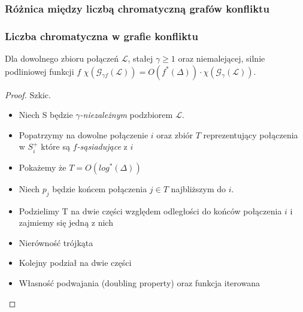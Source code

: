 \documentclass[polish, t,10pt]{beamer}
\begin{document}
\subsubsection{Różnica między liczbą chromatyczną grafów konfliktu}
    \begin{frame}
        \frametitle{Liczba chromatyczna w grafie konfliktu}
        \begin{theorem}
            Dla dowolnego zbioru połączeń $\mathcal{L}$, stałej $\gamma \ge 1$ oraz niemalejącej, silnie podliniowej funkcji $f$
            $\chi(\mathcal{G}_{\gamma f}(\mathcal{L})) = O(f^{*}(\Delta)) \cdot \chi(\mathcal{G}_{\gamma}(\mathcal{L}))$.
        \end{theorem}
        \begin{proof}
            Szkic.
            \begin{itemize}
                \item Niech S będzie \textit{$\gamma$-niezależnym} podzbiorem $\mathcal{L}$.
                \item Popatrzymy na dowolne połączenie $i$ oraz zbiór $T$ reprezentujący połączenia w $S^{+}_i$ które są \textit{$f$-sąsiadujące} z $i$
                \item Pokażemy że $T = O(log^{*}(\Delta))$
                \item Niech $p_j$ będzie końcem połączenia $j \in T$ najbliższym do $i$.
                \item Podzielimy T na dwie części względem odległości do końców połączenia $i$ i zajmiemy się jedną z nich
                \item Nierówność trójkąta
                \item Kolejny podział na dwie części
                \item Własność podwajania (doubling property) oraz funkcja iterowana
            \end{itemize}
        \end{proof}
    \end{frame}
\end{document}
